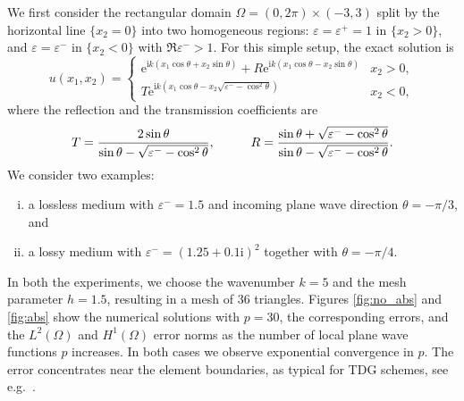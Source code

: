 \documentclass[a4paper,10pt]{article}
\newcommand{\ri}{{\mathrm i}}
\newcommand{\re}{{\mathrm e}}
\begin{document}
We first consider the rectangular domain $\Omega=(0,2\pi)\times(-3,3)$ split by the horizontal line $\{x_2=0\}$ into two homogeneous regions:
$\varepsilon=\varepsilon^+=1$ in $\{x_2>0\}$, and $\varepsilon=\varepsilon^-$ in $\{x_2<0\}$ with $\Re\varepsilon^->1$.
For this simple setup, the exact solution is
\begin{equation*} %
u(x_1,x_2) = \begin{cases}
	\re^{\ri k(x_1 \cos \theta + x_2 \sin \theta)} + R\re^{\ri k(x_1 \cos \theta - x_2 \sin \theta)} & x_2>0,\\
	T\re^{\ri k(x_1 \cos \theta - x_2 \sqrt{\varepsilon^- -\cos^2\theta})} & x_2<0, \end{cases}
	\end{equation*}
	where the reflection and the transmission coefficients are
	\begin{equation*}
T = \frac{2 \sin \theta}{\sin \theta - \sqrt{\varepsilon^- -\cos^2\theta}}, \hspace{1.0cm} R = \frac{\sin \theta + \sqrt{\varepsilon^- - \cos^2\theta}}{\sin \theta - \sqrt{\varepsilon^- -\cos^2\theta}}.
\end{equation*}
We consider two examples: 
\begin{enumerate}[(i)]
\item %
a lossless medium with $\varepsilon^-=1.5$ and incoming plane wave direction $\theta=-\pi/3$, and 
\item %
a lossy medium with $\varepsilon^-=(1.25 + 0.1\ri)^2$ together with $\theta=-\pi/4$.
\end{enumerate}
In both the experiments, we choose the wavenumber $k=5$ and the mesh parameter $h=1.5$, resulting in a mesh of 36 triangles. 
Figures \ref{fig:no_abs} and \ref{fig:abs} show the numerical solutions with $p=30$, the corresponding errors, and the $L^2(\Omega)$ and $H^1(\Omega)$ error norms as the number of local plane wave functions $p$ increases.
In both cases we observe exponential convergence in $p$.
The error concentrates near the element boundaries, as typical for TDG schemes, see e.g.\ \cite{Robert2024}.
\end{document}
